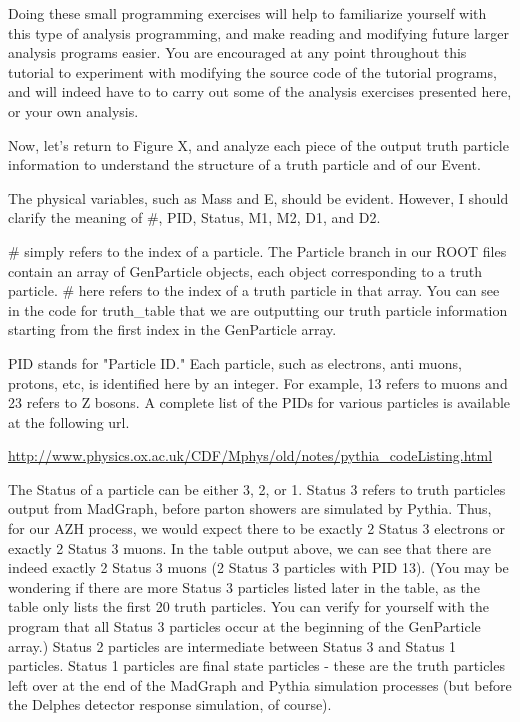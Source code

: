 \documentclass{article}
\begin{document}
Doing these small programming exercises will help to familiarize yourself with this type of analysis programming, and make reading and modifying future larger analysis programs easier. You are encouraged at any point throughout this tutorial to experiment with modifying the source code of the tutorial programs, and will indeed have to to carry out some of the analysis exercises presented here, or your own analysis.

\bigskip

Now, let's return to Figure X, and analyze each piece of the output truth particle information to understand the structure of a truth particle and of our Event.

\bigskip

The physical variables, such as Mass and E, should be evident. However, I should clarify the meaning of \#, PID, Status, M1, M2, D1, and D2.

\bigskip

\# simply refers to the index of a particle. The Particle branch in our ROOT files contain an array of GenParticle objects, each object corresponding to a truth particle. \# here refers to the index of a truth particle in that array. You can see in the code for truth\_table that we are outputting our truth particle information starting from the first index in the GenParticle array.

\bigskip

PID stands for "Particle ID." Each particle, such as electrons, anti muons, protons, etc, is identified here by an integer. For example, 13 refers to muons and 23 refers to Z bosons. A complete list of the PIDs for various particles is available at the following url.

\bigskip

\url{http://www.physics.ox.ac.uk/CDF/Mphys/old/notes/pythia_codeListing.html}

\bigskip

The Status of a particle can be either 3, 2, or 1. Status 3 refers to truth particles output from MadGraph, before parton showers are simulated by Pythia. Thus, for our AZH process, we would expect there to be exactly 2 Status 3 electrons or exactly 2 Status 3 muons. In the table output above, we can see that there are indeed exactly 2 Status 3 muons (2 Status 3 particles with PID 13). (You may be wondering if there are more Status 3 particles listed later in the table, as the table only lists the first 20 truth particles. You can verify for yourself with the program that all Status 3 particles occur at the beginning of the GenParticle array.) Status 2 particles are intermediate between Status 3 and Status 1 particles. Status 1 particles are final state particles - these are the truth particles left over at the end of the MadGraph and Pythia simulation processes (but before the Delphes detector response simulation, of course).
\end{document}
